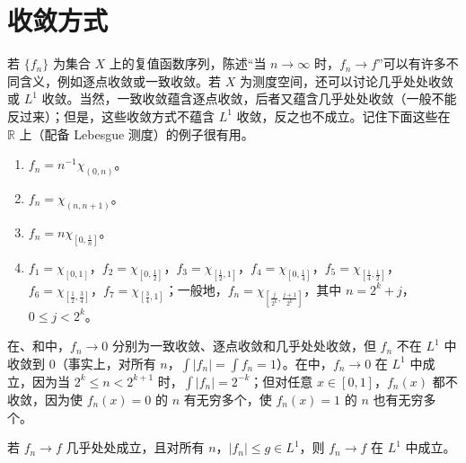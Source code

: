 \documentclass[../../main.tex]{subfiles}%
\begin{document}
\section{收敛方式}\label{section:ch02-modes-of-convergence}
若 $\{f_n\}$ 为集合 $X$ 上的复值函数序列，陈述“当 $n\to\infty$ 时，$f_n\to f$”可以有许多不同含义，例如逐点收敛或一致收敛。若 $X$ 为测度空间，还可以讨论几乎处处收敛或 $L^1$ 收敛。当然，一致收敛蕴含逐点收敛，后者又蕴含几乎处处收敛（一般不能反过来）；但是，这些收敛方式不蕴含 $L^1$ 收敛，反之也不成立。记住下面这些在 $\mathbb{R}$ 上（配备 Lebesgue 测度）的例子很有用。
\begin{examples}\label{examples:ch02-convergence-modes}
\begin{enumerate}[label=\roman*.,ref=(\roman*)]
\item\label{item:ch02-convergence-spreading} $f_n=n^{-1}\chi_{(0,n)}$。
\item\label{item:ch02-convergence-translating} $f_n=\chi_{(n,n+1)}$。
\item\label{item:ch02-convergence-concentrating} $f_n=n\chi_{[0,\frac1n]}$。
\item\label{item:ch02-convergence-typewriter} $f_1=\chi_{[0,1]}$，$f_2=\chi_{[0,\frac12]}$，$f_3=\chi_{[\frac12,1]}$，$f_4=\chi_{[0,\frac14]}$，$f_5=\chi_{[\frac14,\frac12]}$，$f_6=\chi_{[\frac12,\frac34]}$，$f_7=\chi_{[\frac34,1]}$；一般地，$f_n=\chi_{[\frac{j}{2^k},\frac{j+1}{2^k}]}$，其中 $n=2^k+j$，$0\le j<2^k$。
\end{enumerate}
在、和中，$f_n\to0$ 分别为一致收敛、逐点收敛和几乎处处收敛，但 $f_n$ 不在 $L^1$ 中收敛到 $0$（事实上，对所有 $n$，$\int|f_n|=\int f_n=1$）。在中，$f_n\to0$ 在 $L^1$ 中成立，因为当 $2^k\le n<2^{k+1}$ 时，$\int|f_n|=2^{-k}$；但对任意 $x\in[0,1]$，$f_n(x)$ 都不收敛，因为使 $f_n(x)=0$ 的 $n$ 有无穷多个，使 $f_n(x)=1$ 的 $n$ 也有无穷多个。
\end{examples}
\begin{proposition}\label{proposition:ch02-dominated-lone-convergence}
若 $f_n\to f$ 几乎处处成立，且对所有 $n$，$|f_n|\le g\in L^1$，则 $f_n\to f$ 在 $L^1$ 中成立。
\end{proposition}
\end{document}
